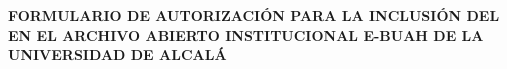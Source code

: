 
\graphicspath{{../../logos/}{../../figures/}{../../diagrams/}} %
 





\pagestyle{empty}

% 


% 

\begin{spacing}{1.0}
\begin{center}

  \Large\textbf{FORMULARIO DE AUTORIZACIÓN PARA LA INCLUSIÓN DEL
    \MakeUppercase{\myWorkTypeFull} EN EL ARCHIVO ABIERTO INSTITUCIONAL E-BUAH
    DE LA UNIVERSIDAD DE ALCALÁ}

\end{center}
\end{spacing}
\vspace{0.5cm}

